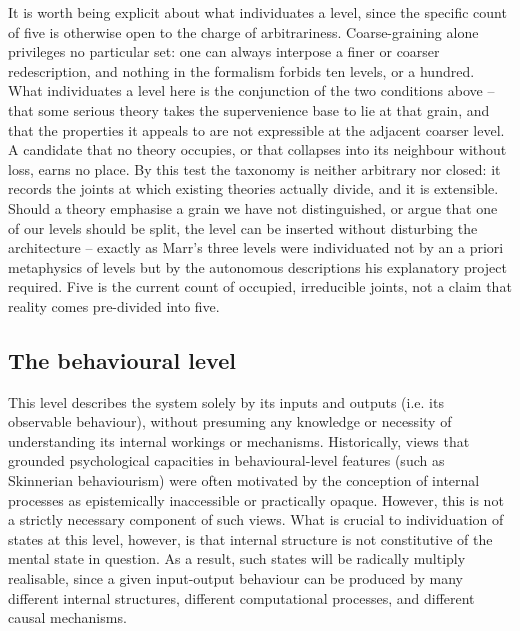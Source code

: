 \documentclass[11pt, a4paper, onecolumn, gdm]{google}
\begin{document}
It is worth being explicit about what individuates a level, since the specific count of five is otherwise open to the charge of arbitrariness.
Coarse-graining alone privileges no particular set: one can always interpose a finer or coarser redescription, and nothing in the formalism forbids ten levels, or a hundred.
What individuates a level here is the conjunction of the two conditions above -- that some serious theory takes the supervenience base to lie at that grain, and that the properties it appeals to are not expressible at the adjacent coarser level.
A candidate that no theory occupies, or that collapses into its neighbour without loss, earns no place.
By this test the taxonomy is neither arbitrary nor closed: it records the joints at which existing theories actually divide, and it is extensible.
Should a theory emphasise a grain we have not distinguished, or argue that one of our levels should be split, the level can be inserted without disturbing the architecture -- exactly as Marr's three levels were individuated not by an a priori metaphysics of levels but by the autonomous descriptions his explanatory project required.
Five is the current count of occupied, irreducible joints, not a claim that reality comes pre-divided into five.

\subsection{The behavioural level}\label{the-behavioural-level}

This level describes the system solely by its inputs and outputs (i.e. its observable behaviour), without presuming any knowledge or necessity of understanding its internal workings or mechanisms.
Historically, views that grounded psychological capacities in behavioural-level features (such as Skinnerian behaviourism) were often motivated by the conception of internal processes as epistemically inaccessible or practically opaque.
However, this is not a strictly necessary component of such views.
What is crucial to individuation of states at this level, however, is that internal structure is not constitutive of the mental state in question.
As a result, such states will be radically multiply realisable, since a given input-output behaviour can be produced by many different internal structures, different computational processes, and different causal mechanisms.
\end{document}
